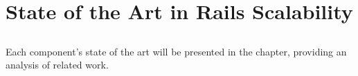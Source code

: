 \chapter{State of the Art in Rails Scalability} %
\label{cha:state_of_the_art}

\section*{} %
Each component's state of the art will be presented in the chapter, providing an analysis of related work.






